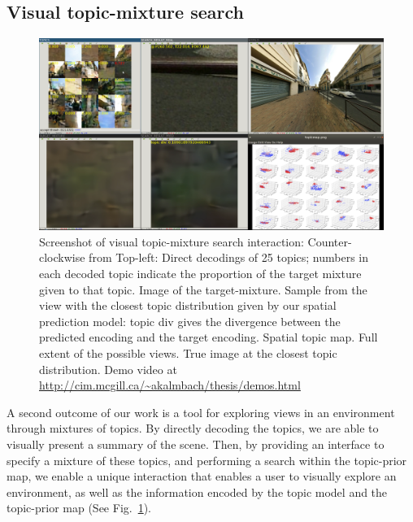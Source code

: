 \subsection{Visual topic-mixture search}
\begin{figure}
    \centering
    \includegraphics[width=\textwidth]{figures/ptz/interaction.png}
    \caption{Screenshot of visual topic-mixture search interaction: Counter-clockwise from Top-left: Direct decodings of 25 topics; numbers in each decoded topic indicate the proportion of the target mixture given to that topic. Image of the target-mixture. Sample from the view with the closest topic distribution given by our spatial prediction model: topic div gives the divergence between the predicted encoding and the target encoding. Spatial topic map. Full extent of the possible views. True image at the closest topic distribution. Demo video at \protect\url{http://cim.mcgill.ca/\~akalmbach/thesis/demos.html}}
    \label{fig:interaction}
\end{figure}

A second outcome of our work is a tool for exploring views in an environment through mixtures of topics. By directly decoding the topics, we are able to visually present a summary of the scene. Then, by providing an interface to specify a mixture of these topics, and performing a search within the topic-prior map, we enable a unique interaction that enables a user to visually explore an environment, as well as the information encoded by the topic model and the topic-prior map (See Fig.~\ref{fig:interaction}).

